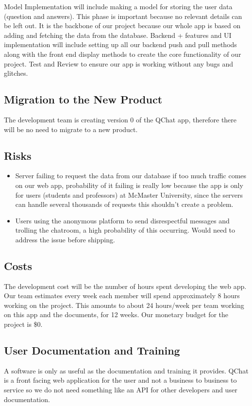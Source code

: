 \documentclass[12pt, titlepage]{article}
\begin{document}
Model Implementation will include making a model for storing the user data (question and answers). This phase is important because no relevant details can be left out. It is the backbone of our project because our whole app is based on adding and fetching the data from the database. Backend + features and UI implementation will include setting up all our backend push and pull methods along with the front end display methods to create the core functionality of our project. Test and Review to ensure our app is working without any bugs and glitches.

\subsection{Migration to the New Product}
The development team is creating version 0 of the QChat app, therefore there will be no need to migrate to a new product.

\subsection{Risks}
\begin{itemize}
    \item Server failing to request the data from our database if too much traffic comes on our web app, probability of it failing is really low because the app is only for users (students and professors) at McMaster University, since the servers can handle several thousands of requests this shouldn’t create a problem.
    \item Users using the anonymous platform to send disrespectful messages and trolling the chatroom, a high probability of this occurring. Would need to address the issue before shipping.
\end{itemize}

\subsection{Costs}
The development cost will be the number of hours spent developing the web app. Our team estimates every week each member will spend approximately 8 hours working on the project. This amounts to about 24 hours/week per team working on this app and the documents, for 12 weeks. Our monetary budget for the project is \$0.

\subsection{User Documentation and Training}
A software is only as useful as the documentation and training it provides. QChat is a front facing web application for the user and not a business to business to service so we do not need something like an API for other developers and user documentation.
\end{document}
